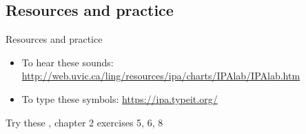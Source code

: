 \documentclass{beamer}
\newcommand{\subtwofive}{Resources and practice}
\begin{document}
    \subsection{\subtwofive}
      \begin{frame}{\subtwofive}
        \begin{block}{}
          \begin{itemize}
            \item To hear these sounds: \url{http://web.uvic.ca/ling/resources/ipa/charts/IPAlab/IPAlab.htm}
            \item To type these symbols: \url{https://ipa.typeit.org/}
          \end{itemize}
        \end{block}
        \begin{adjustbox}{width=\textwidth}
          
        \end{adjustbox}
        \begin{block}{Try these}
          \textcite{dawson_language_2016}, chapter 2 exercises 5, 6, 8
        \end{block}
      \end{frame}
\end{document}
